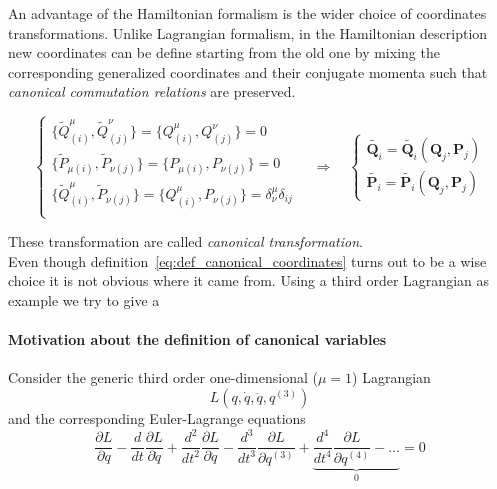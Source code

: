 An advantage of the Hamiltonian formalism is the wider choice of coordinates
transformations. Unlike Lagrangian formalism, in the Hamiltonian description new
coordinates can be define starting from the old one by mixing the corresponding
generalized coordinates and their conjugate momenta such that \emph{canonical
commutation relations} are preserved.

\begin{equation} \label{eq:canonical_transformation}
  \begin{cases}
    \{\tilde{Q}^{\mu}_{(i)}, \tilde{Q}^{\nu}_{(j)}\} =
    \{Q^{\mu}_{(i)}, Q^{\nu}_{(j)}\} = 0 \\
    \{\tilde{P}_{\mu(i)}, \tilde{P}_{\nu(j)}\} =
    \{P_{\mu(i)}, P_{\nu(j)}\} = 0 \\
    \{\tilde{Q}^{\mu}_{(i)}, \tilde{P}_{\nu(j)}\} =
    \{Q^{\mu}_{(i)}, P_{\nu(j)}\} = \delta^{\mu}_{\nu} \delta_{ij}\\
  \end{cases}
  \quad \Rightarrow \quad
  \begin{cases}
    \tilde{\bm{Q}_i} = \tilde{\bm{Q}_i}(\bm{Q}_j, \bm{P}_j) \\
    \tilde{\bm{P}_i} = \tilde{\bm{P}_i}(\bm{Q}_j, \bm{P}_j)
  \end{cases}
\end{equation}

These transformation are called \emph{canonical transformation}.\\

Even though definition~\eqref{eq:def_canonical_coordinates} turns out to be a
wise choice it is not obvious where it came from. Using a third order
Lagrangian as example we try to give a
\paragraph{Motivation about the definition of canonical variables}
Consider the generic third order one-dimensional ($\mu=1$) Lagrangian
\begin{equation*}
  L\left( q, \dot{q}, \ddot{q}, q^{(3)} \right)
\end{equation*}
and the corresponding Euler-Lagrange equations
\begin{equation} \label{eq:third_order_euler_lagrangian}
  \frac{\partial L}{\partial q} -
  \frac{d}{dt}\frac{\partial L}{\partial \dot{q}} +
  \frac{d^2}{dt^2}\frac{\partial L}{\partial \ddot{q}} -
  \frac{d^3}{dt^3}\frac{\partial L}{\partial q^{(3)}} +
  \underbrace{
  \frac{d^4}{dt^4}\frac{\partial L}{\partial q^{(4)}} - \ldots }_0 = 0
\end{equation}

